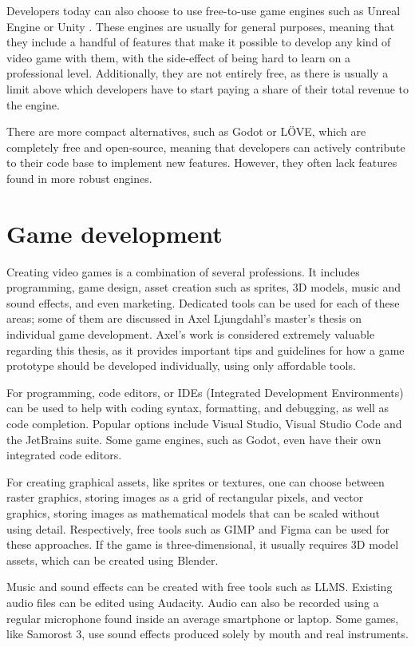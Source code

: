 Developers today can also choose to use free-to-use game engines such as Unreal Engine \cite{unrealEngine} or Unity \cite{unity}. These engines are usually for general purposes, meaning that they include a handful of features that make it possible to develop any kind of video game with them, with the side-effect of being hard to learn on a professional level. Additionally, they are not entirely free, as there is usually a limit above which developers have to start paying a share of their total revenue to the engine. 

There are more compact alternatives, such as Godot\cite{godot} or LÖVE\cite{love2d}, which are completely free and open-source, meaning that developers can actively contribute to their code base to implement new features. However, they often lack features found in more robust engines.



\section{Game development} \label{Section:GameDevelopment}

Creating video games is a combination of several professions. It includes programming, game design, asset creation such as sprites, 3D models, music and sound effects, and even marketing. Dedicated tools can be used for each of these areas; some of them are discussed in Axel Ljungdahl's master's thesis \cite{ljungdahl2020individual} on individual game development. Axel's work is considered extremely valuable regarding this thesis, as it provides important tips and guidelines for how a game prototype should be developed individually, using only affordable tools.

For programming, code editors, or IDEs (Integrated Development Environments) can be used to help with coding syntax, formatting, and debugging, as well as code completion. Popular options include Visual Studio\cite{visualStudio}, Visual Studio Code\cite{visualStudioCode} and the JetBrains\cite{jetBrains} suite. Some game engines, such as Godot, even have their own integrated code editors. \cite{ljungdahl2020individual}

For creating graphical assets, like sprites or textures, one can choose between raster graphics, storing images as a grid of rectangular pixels, and vector graphics, storing images as mathematical models that can be scaled without using detail. Respectively, free tools such as GIMP \cite{gimp} and Figma \cite{figma} can be used for these approaches. If the game is three-dimensional, it usually requires 3D model assets, which can be created using Blender\cite{blender}. \cite{ljungdahl2020individual}

Music and sound effects can be created with free tools such as LLMS. Existing audio files can be edited using Audacity. Audio can also be recorded using a regular microphone found inside an average smartphone or laptop. Some games, like Samorost 3\cite{samorost3_2016}, use sound effects produced solely by mouth and real instruments.